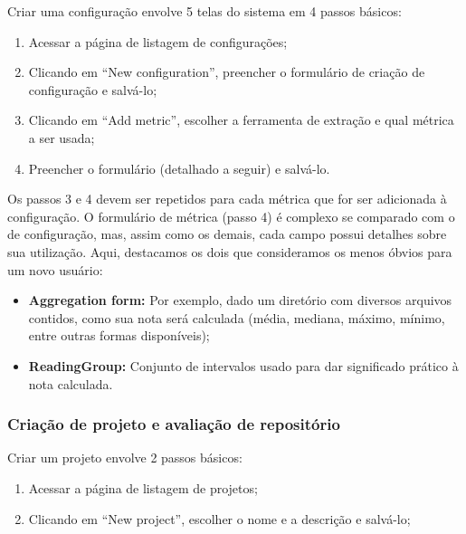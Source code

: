 \documentclass[12pt]{article}
\begin{document}
    Criar uma configuração envolve 5 telas do sistema em 4 passos básicos:
    \begin{enumerate}
      \item Acessar a página de listagem de configurações;
      \item Clicando em ``New configuration'', preencher o formulário de criação de configuração e salvá-lo;
      \item Clicando em ``Add metric'', escolher a ferramenta de extração e qual métrica a ser usada;
      \item Preencher o formulário (detalhado a seguir) e salvá-lo.
    \end{enumerate}

    Os passos 3 e 4 devem ser repetidos para cada métrica que for ser adicionada à configuração. O formulário de métrica (passo 4) é complexo se comparado com o de configuração, mas, assim como os demais, cada campo possui detalhes sobre sua utilização. Aqui, destacamos os dois que consideramos os menos óbvios para um novo usuário:
    \begin{itemize}
      \item \textbf{Aggregation form:} Por exemplo, dado um diretório com diversos arquivos contidos, como sua nota será calculada (média, mediana, máximo, mínimo, entre outras formas disponíveis);
      \item \textbf{ReadingGroup:} Conjunto de intervalos usado para dar significado prático à nota calculada.
    \end{itemize}

    \subsubsection{Criação de projeto e avaliação de repositório}

    Criar um projeto envolve 2 passos básicos:
    \begin{enumerate}
      \item Acessar a página de listagem de projetos;
      \item Clicando em ``New project'', escolher o nome e a descrição e salvá-lo;
    \end{enumerate}
\end{document}
